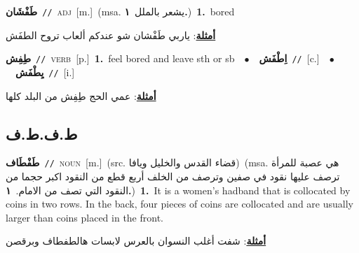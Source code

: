 \documentclass[10pt,a4paper,twoside]{article} %
\begin{document}
\begin{multicols}{2}
{\setlength\topsep{0pt}\textbf{\foreignlanguage{arabic}{طَفْشَان}}\ {\color{gray}\texttt{//}\color{black}}\ \textsc{adj}\ [m.]\ \color{gray}(msa. \foreignlanguage{arabic}{يشعر بالملل}~\foreignlanguage{arabic}{\textbf{١.}})\color{black}\ \textbf{1.}~bored\  \begin{flushright}\color{gray}\foreignlanguage{arabic}{\textbf{\underline{\foreignlanguage{arabic}{أمثلة}}}: ياربي طَفْشان شو عندكم ألعاب تروح الطفَش}\end{flushright}\color{black}} \vspace{2mm}

{\setlength\topsep{0pt}\textbf{\foreignlanguage{arabic}{طِفِش}}\ {\color{gray}\texttt{//}\color{black}}\ \textsc{verb}\ [p.]\ \textbf{1.}~feel bored and leave sth or sb\ \ $\bullet$\ \ \setlength\topsep{0pt}\textbf{\foreignlanguage{arabic}{اِطْفَش}}\ {\color{gray}\texttt{//}\color{black}}\ [c.]\ \ $\bullet$\ \ \setlength\topsep{0pt}\textbf{\foreignlanguage{arabic}{يِطْفَش}}\ {\color{gray}\texttt{//}\color{black}}\ [i.]\  \begin{flushright}\color{gray}\foreignlanguage{arabic}{\textbf{\underline{\foreignlanguage{arabic}{أمثلة}}}: عمي الحج طِفِش من البلد كلها}\end{flushright}\color{black}} \vspace{2mm}

\vspace{-3mm}
\subsection*{\color{blue}\foreignlanguage{arabic}{ط.ف.ط.ف}\color{blue}{}} 

{\setlength\topsep{0pt}\textbf{\foreignlanguage{arabic}{طَفْطَاف}}\ {\color{gray}\texttt{//}\color{black}}\ \textsc{noun}\ [m.]\ (src. \color{gray}\foreignlanguage{arabic}{قضاء القدس والخليل ويافا}\color{black})\ \color{gray}(msa. \foreignlanguage{arabic}{هي عصبة للمرأة ترصف عليها نقود في صفين وترصف من الخلف أربع قطع من النقود اكبر حجما من النقود التي تصف من الامام.}~\foreignlanguage{arabic}{\textbf{١.}})\color{black}\ \textbf{1.}~It is a women's hadband that is collocated by coins in two rows. In the back, four pieces of coins are collocated and are usually larger than coins placed in the front.\  \begin{flushright}\color{gray}\foreignlanguage{arabic}{\textbf{\underline{\foreignlanguage{arabic}{أمثلة}}}: شفت أغلب النسوان بالعرس لابسات هالطفطاف وبرقصن}\end{flushright}\color{black}} \vspace{2mm}


\end{multicols}
\end{document}
